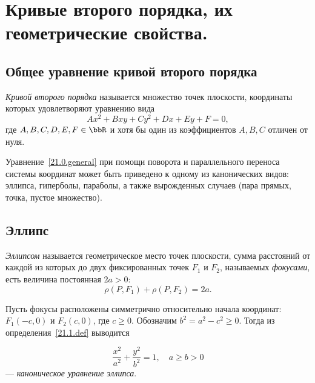 \chapter{Кривые второго порядка, их геометрические свойства.}

\section{Общее уравнение кривой второго порядка}

\begin{defn}
\textit{Кривой второго порядка} называется множество точек плоскости, координаты которых удовлетворяют уравнению вида
\begin{equation}\label{21.0.general}
  Ax^2 + Bxy + Cy^2 + Dx + Ey + F = 0,
\end{equation}
где $A, B, C, D, E, F \in \bbR$ и хотя бы один из коэффициентов $A, B, C$ отличен от нуля.
\end{defn}

\begin{notion}
Уравнение~\eqref{21.0.general} при помощи поворота и параллельного переноса системы координат может быть приведено к одному из канонических видов: эллипса, гиперболы, параболы, а также вырожденных случаев (пара прямых, точка, пустое множество).
\end{notion}

\section{Эллипс}

\begin{defn}
\textit{Эллипсом} называется геометрическое место точек плоскости, сумма расстояний от каждой из которых до двух фиксированных точек $F_1$ и $F_2$, называемых \textit{фокусами}, есть величина постоянная $2a > 0$:
\begin{equation}\label{21.1.def}
  \rho(P, F_1) + \rho(P, F_2) = 2a.
\end{equation}
\end{defn}

Пусть фокусы расположены симметрично относительно начала координат: $F_1(-c, 0)$ и $F_2(c, 0)$, где $c \geq 0$. Обозначим $b^2 = a^2 - c^2 \geq 0$. Тогда из определения~\eqref{21.1.def} выводится

\begin{equation}\label{21.1.canon}
  \frac{x^2}{a^2} + \frac{y^2}{b^2} = 1, \quad a \geq b > 0
\end{equation}
--- \textit{каноническое уравнение эллипса}.

